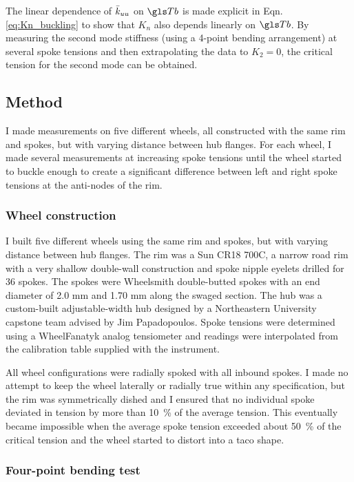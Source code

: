 \documentclass[\rootdir/thesis.tex]{subfiles}
\begin{document}
The linear dependence of $\bar{k}_{uu}$ on $\Tb$ is made explicit in Eqn. \eqref{eq:Kn_buckling} to show that $K_n$ also depends linearly on $\Tb$. By measuring the second mode stiffness (using a 4-point bending arrangement) at several spoke tensions and then extrapolating the data to $K_2 = 0$, the critical tension for the second mode can be obtained.

\subsection{Method}

I made measurements on five different wheels, all constructed with the same rim and spokes, but with varying distance between hub flanges. For each wheel, I made several measurements at increasing spoke tensions until the wheel started to buckle enough to create a significant difference between left and right spoke tensions at the anti-nodes of the rim.

\subsubsection{Wheel construction}

I built five different wheels using the same rim and spokes, but with varying distance between hub flanges. The rim was a Sun CR18 700C, a narrow road rim with a very shallow double-wall construction and spoke nipple eyelets drilled for 36 spokes. The spokes were Wheelsmith double-butted spokes with an end diameter of 2.0 mm and 1.70 mm along the swaged section. The hub was a custom-built adjustable-width hub designed by a Northeastern University capstone team advised by Jim Papadopoulos. Spoke tensions were determined using a WheelFanatyk analog tensiometer and readings were interpolated from the calibration table supplied with the instrument.

All wheel configurations were radially spoked with all inbound spokes. I made no attempt to keep the wheel laterally or radially true within any specification, but the rim was symmetrically dished and I ensured that no individual spoke deviated in tension by more than \SI{10}{\percent} of the average tension. This eventually became impossible when the average spoke tension exceeded about \SI{50}{\percent} of the critical tension and the wheel started to distort into a taco shape.

\subsubsection{Four-point bending test}
\end{document}
